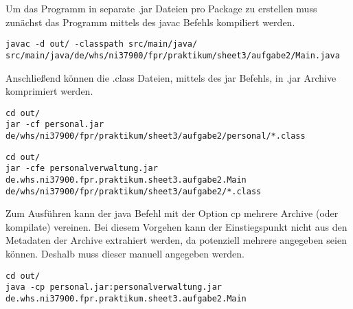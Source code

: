 Um das Programm in separate .jar Dateien pro Package zu erstellen muss zunächst das Programm mittels des javac Befehls kompiliert werden.
\begin{lstlisting}[label={lst:compile-class-files}, caption={Comilieren der .java Dateien zu .class Dateien}]
javac -d out/ -classpath src/main/java/ src/main/java/de/whs/ni37900/fpr/praktikum/sheet3/aufgabe2/Main.java
\end{lstlisting}
Anschließend können die .class Dateien, mittels des jar Befehls, in .jar Archive komprimiert werden.
\begin{lstlisting}[label={lst:package-personal}, caption={Erstellen des Java Archives personal.jar}]
cd out/
jar -cf personal.jar de/whs/ni37900/fpr/praktikum/sheet3/aufgabe2/personal/*.class
\end{lstlisting}
\begin{lstlisting}[label={lst:compile-package-personalverwaltung}, caption={Erstellen des Java Archieves personalverwaltung.jar}]
cd out/
jar -cfe personalverwaltung.jar de.whs.ni37900.fpr.praktikum.sheet3.aufgabe2.Main de/whs/ni37900/fpr/praktikum/sheet3/aufgabe2/*.class
\end{lstlisting}
Zum Ausführen kann der java Befehl mit der Option cp mehrere Archive (oder kompilate) vereinen.
Bei diesem Vorgehen kann der Einstiegspunkt nicht aus den Metadaten der Archive extrahiert werden, da potenziell mehrere angegeben seien können.
Deshalb muss dieser manuell angegeben werden.
\begin{lstlisting}[label={lst:compile-run-personalverwaltung}, caption={Starten der Personalverwaltung}]
cd out/
java -cp personal.jar:personalverwaltung.jar de.whs.ni37900.fpr.praktikum.sheet3.aufgabe2.Main
\end{lstlisting}
